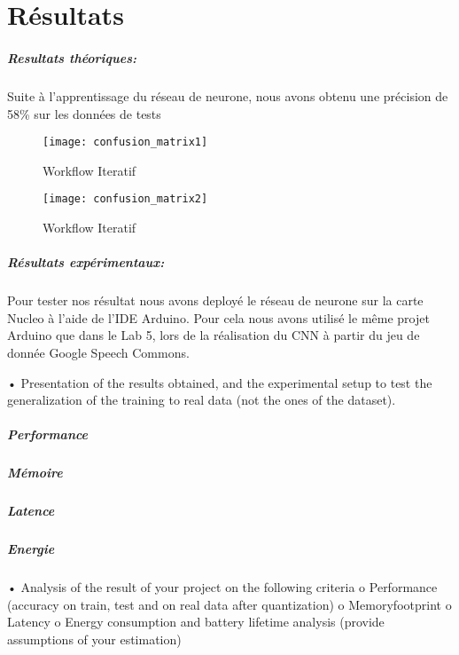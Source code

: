 \chapter{Résultats}


\paragraph{Resultats théoriques: }
Suite à l'apprentissage du réseau de neurone, nous avons obtenu une précision de 58\% sur les données de tests 

\begin{figure}[!ht]
  \texttt{[image: confusion\_matrix1]}
  \centering
  \caption{Workflow Iteratif}
  \label{graph:confusion_matrix1}
\end{figure}


\begin{figure}[!ht]
  \texttt{[image: confusion\_matrix2]}
  \centering
  \caption{Workflow Iteratif}
  \label{graph:confusion_matrix2}
\end{figure}


\paragraph{Résultats expérimentaux: } Pour tester nos résultat nous avons deployé le réseau de neurone sur la carte Nucleo à l'aide 
de l'IDE Arduino. Pour cela nous avons utilisé le même projet Arduino que dans le Lab 5, lors de la réalisation du CNN à partir du
jeu de donnée Google Speech Commons.



• Presentation of the results obtained, and the experimental setup to test the generalization of
the training to real data (not the ones of the dataset).


\paragraph{Performance}
\paragraph{Mémoire}
\paragraph{Latence}
\paragraph{Energie}
• Analysis of the result of your project on the following criteria
o Performance (accuracy on train, test and on real data after quantization)
o Memoryfootprint
o Latency
o Energy consumption and battery lifetime analysis (provide assumptions of your
estimation)

